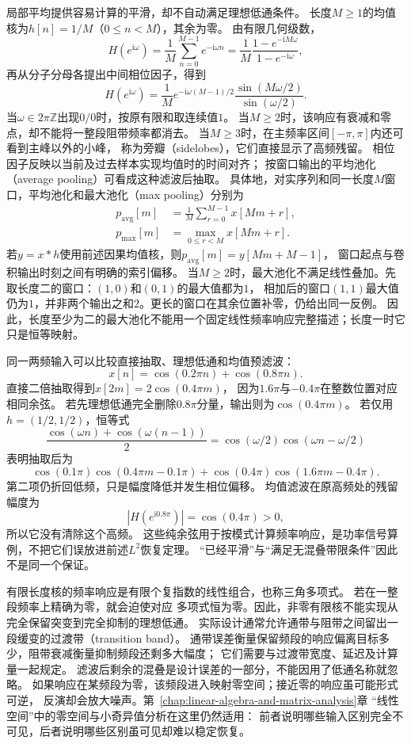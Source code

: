 局部平均提供容易计算的平滑，却不自动满足理想低通条件。
长度$M\geq1$的均值核为$h[n]=1/M$（$0\leq n<M$），其余为零。
由有限几何级数，
\[
  H(e^{\mathrm i\omega})=\frac1M\sum_{n=0}^{M-1}e^{-\mathrm i\omega n}
  =\frac1M\frac{1-e^{-\mathrm iM\omega}}{1-e^{-\mathrm i\omega}},
\]
再从分子分母各提出中间相位因子，得到
\begin{equation}
  H(e^{\mathrm i\omega})=
  \frac1M e^{-\mathrm i\omega(M-1)/2}
  \frac{\sin(M\omega/2)}{\sin(\omega/2)}.
  \label{eq:signal-analysis-moving-average-response}
\end{equation}
当$\omega\in2\pi\mathbb Z$出现$0/0$时，按原有限和取连续值$1$。
当$M\geq2$时，该响应有衰减和零点，却不能将一整段阻带频率都消去。
当$M\geq3$时，在主频率区间$[-\pi,\pi]$内还可看到主峰以外的小峰，
称为旁瓣（sidelobes），它们直接显示了高频残留。
相位因子反映以当前及过去样本实现均值时的时间对齐；
按窗口输出的平均池化（average pooling）可看成这种滤波后抽取。
具体地，对实序列和同一长度$M$窗口，平均池化和最大池化（max pooling）分别为
\[
 \begin{aligned}
  p_{\mathrm{avg}}[m]&=\frac1M\sum_{r=0}^{M-1}x[Mm+r],\\
  p_{\mathrm{max}}[m]&=\max_{0\leq r<M}x[Mm+r].
 \end{aligned}
\]
若$y=x*h$使用前述因果均值核，则$p_{\mathrm{avg}}[m]=y[Mm+M-1]$，
窗口起点与卷积输出时刻之间有明确的索引偏移。
当$M\geq2$时，最大池化不满足线性叠加。先取长度二的窗口：$(1,0)$和$(0,1)$的最大值都为$1$，
相加后的窗口$(1,1)$最大值仍为$1$，并非两个输出之和$2$。更长的窗口在其余位置补零，仍给出同一反例。
因此，长度至少为二的最大池化不能用一个固定线性频率响应完整描述；长度一时它只是恒等映射。

同一两频输入可以比较直接抽取、理想低通和均值预滤波：
\[
  x[n]=\cos(0.2\pi n)+\cos(0.8\pi n).
\]
直接二倍抽取得到$x[2m]=2\cos(0.4\pi m)$，
因为$1.6\pi$与$-0.4\pi$在整数位置对应相同余弦。
若先理想低通完全删除$0.8\pi$分量，输出则为$\cos(0.4\pi m)$。
若仅用$h=(1/2,1/2)$，恒等式
\[
  \frac{\cos(\omega n)+\cos(\omega(n-1))}{2}
  =\cos(\omega/2)\cos(\omega n-\omega/2)
\]
表明抽取后为
\[
  \cos(0.1\pi)\cos(0.4\pi m-0.1\pi)
  +\cos(0.4\pi)\cos(1.6\pi m-0.4\pi).
\]
第二项仍折回低频，只是幅度降低并发生相位偏移。
均值滤波在原高频处的残留幅度为
\[
 |H(e^{\mathrm i0.8\pi})|=\cos(0.4\pi)>0,
\]
所以它没有清除这个高频。
这些纯余弦用于按模式计算频率响应，是功率信号算例，不把它们误放进前述$L^2$恢复定理。
“已经平滑”与“满足无混叠带限条件”因此不是同一个保证。

有限长度核的频率响应是有限个复指数的线性组合，也称三角多项式。
若在一整段频率上精确为零，就会迫使对应
多项式恒为零。因此，非零有限核不能实现从完全保留突变到完全抑制的理想低通。
实际设计通常允许通带与阻带之间留出一段缓变的过渡带（transition band）。
通带误差衡量保留频段的响应偏离目标多少，阻带衰减衡量抑制频段还剩多大幅度；
它们需要与过渡带宽度、延迟及计算量一起规定。
滤波后剩余的混叠是设计误差的一部分，不能因用了低通名称就忽略。
如果响应在某频段为零，该频段进入映射零空间；接近零的响应虽可能形式可逆，
反演却会放大噪声。第~\ref{chap:linear-algebra-and-matrix-analysis}章
“线性空间”中的零空间与小奇异值分析在这里仍然适用：
前者说明哪些输入区别完全不可见，后者说明哪些区别虽可见却难以稳定恢复。


